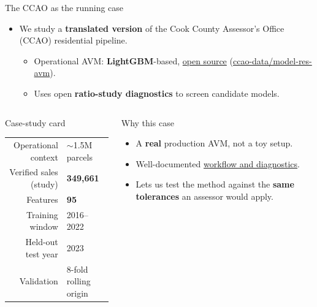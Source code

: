 \documentclass[aspectratio=169,12pt,]{beamer}
\newcommand{\1}{\mathbf{1}}
\begin{document}
\begin{frame}{The CCAO as the running case}

\begin{itemize}
    \item We study a \textbf{translated version} of the Cook County Assessor's Office (CCAO) residential pipeline.
    \begin{itemize}
        \item Operational AVM: \textbf{LightGBM}-based, \underline{open source} (\href{https://github.com/ccao-data/model-res-avm/tree/2025-assessment-year/pipeline}{\color{blue}ccao-data/model-res-avm}).
        \item Uses open \textbf{ratio-study diagnostics} to screen candidate models.
    \end{itemize}
\end{itemize}

\medskip

\begin{columns}[T,onlytextwidth]
\begin{block}{ Case-study card}
\small
\begin{tabular}{rl}
Operational context & $\sim$1.5M parcels \\
Verified sales (study) & \textbf{349{,}661} \\
Features & \textbf{95} \\
Training window & 2016--2022 \\
Held-out test year & 2023 \\
Validation & 8-fold rolling origin \\
\end{tabular}
\end{block}

\begin{block}{ Why this case}
\begin{itemize}
    \item A \textbf{real} production AVM, not a toy setup.
    \item Well-documented \underline{workflow and diagnostics}.
    \item Lets us test the method against the \textbf{same tolerances} an assessor would apply.
\end{itemize}
\end{block}
\end{columns}

\end{frame}
\end{document}
